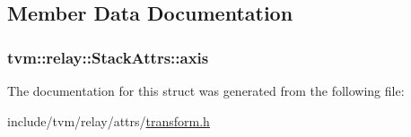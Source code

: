 \subsection{Member Data Documentation}
\subsubsection[{\texorpdfstring{axis}{axis}}]{ tvm\+::relay\+::\+Stack\+Attrs\+::axis}\hypertarget{structtvm_1_1relay_1_1StackAttrs_a5baf92c2303bbdabf5aa90f1ab66ad12}{}\label{structtvm_1_1relay_1_1StackAttrs_a5baf92c2303bbdabf5aa90f1ab66ad12}


The documentation for this struct was generated from the following file\+:\begin{DoxyCompactItemize}
\item 
include/tvm/relay/attrs/\hyperlink{include_2tvm_2relay_2attrs_2transform_8h}{transform.\+h}\end{DoxyCompactItemize}
